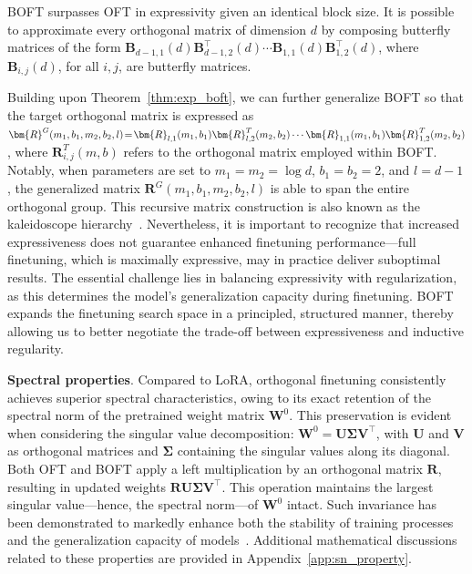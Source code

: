 \begin{theorem}\label{thm:exp_boft}
    BOFT surpasses OFT in expressivity given an identical block size. It is possible to approximate every orthogonal matrix of dimension $d$ by composing butterfly matrices of the form $\bm{B}_{d-1,1}(d)\bm{B}^\top_{d-1,2}(d)\cdots\bm{B}_{1,1}(d)\bm{B}^\top_{1,2}(d)$, where $\bm{B}_{i,j}(d)$, for all $i, j$, are butterfly matrices.
\end{theorem}

Building upon Theorem~\ref{thm:exp_boft}, we can further generalize BOFT so that the target orthogonal matrix is expressed as $\thickmuskip=2mu \medmuskip=2mu \bm{R}^G(m_1,b_1,m_2,b_2,l)=\bm{R}_{l,1}(m_1,b_1)\bm{R}_{l,2}^T(m_2,b_2)\cdots\bm{R}_{1,1}(m_1,b_1)\bm{R}_{1,2}^T(m_2,b_2)$, where $\bm{R}_{i,j}^T(m,b)$ refers to the orthogonal matrix employed within BOFT. Notably, when parameters are set to $m_1=m_2=\log d$, $b_1=b_2=2$, and $l=d-1$, the generalized matrix $\bm{R}^G(m_1,b_1,m_2,b_2,l)$ is able to span the entire orthogonal group. This recursive matrix construction is also known as the kaleidoscope hierarchy~\cite{dao2019kaleidoscope}. Nevertheless, it is important to recognize that increased expressiveness does not guarantee enhanced finetuning performance—full finetuning, which is maximally expressive, may in practice deliver suboptimal results. The essential challenge lies in balancing expressivity with regularization, as this determines the model’s generalization capacity during finetuning. BOFT expands the finetuning search space in a principled, structured manner, thereby allowing us to better negotiate the trade-off between expressiveness and inductive regularity.

\textbf{Spectral properties}. Compared to LoRA, orthogonal finetuning consistently achieves superior spectral characteristics, owing to its exact retention of the spectral norm of the pretrained weight matrix $\bm{W}^0$. This preservation is evident when considering the singular value decomposition: $\bm{W}^0=\bm{U}\bm{\Sigma}\bm{V}^\top$, with $\bm{U}$ and $\bm{V}$ as orthogonal matrices and $\bm{\Sigma}$ containing the singular values along its diagonal. Both OFT and BOFT apply a left multiplication by an orthogonal matrix $\bm{R}$, resulting in updated weights $\bm{R}\bm{U}\bm{\Sigma}\bm{V}^\top$. This operation maintains the largest singular value—hence, the spectral norm—of $\bm{W}^0$ intact. Such invariance has been demonstrated to markedly enhance both the stability of training processes and the generalization capacity of models~\cite{miyato2018spectral,yoshida2017spectral}. Additional mathematical discussions related to these properties are provided in Appendix~\ref{app:sn_property}.

